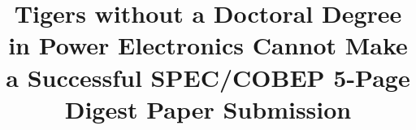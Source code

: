 \documentclass[pdftex,11pt,oneside,letter]{article}
\begin{document}
\title {\large  \bf \vspace{-8ex}
Tigers without a Doctoral Degree in Power Electronics Cannot Make a Successful SPEC/COBEP 5-Page Digest Paper Submission
\vspace{-10ex}}
\date{}
\maketitle
\thispagestyle{empty}
\pagestyle{empty}

\renewcommand{\figurename}{Fig.}









{\vspace{\baselineskip}


}
\end{document}
